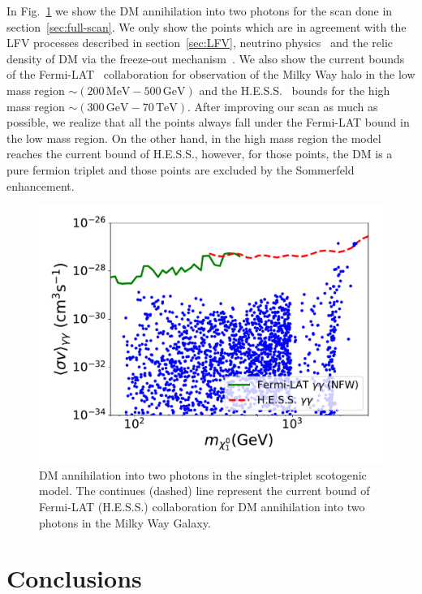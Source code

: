 \documentclass[12pt,letterpaper]{article}
\begin{document}
In Fig.~\ref{fig:sigmavgg} we show the DM annihilation into two photons for the scan done in section~\ref{sec:full-scan}. We only show the points which are in agreement with the LFV processes described in section~\ref{sec:LFV}, neutrino physics~\cite{deSalas:2017kay} and the relic density of DM via the freeze-out mechanism~\cite{Aghanim:2018eyx}.
We also show the current bounds of the Fermi-LAT~\cite{Ackermann:2015lka} collaboration for observation of the Milky Way halo in the low mass region $\sim (200\,\text{MeV}-500\,\text{GeV})$ and the H.E.S.S.~\cite{Abdallah:2018qtu} bounds for the high mass region $\sim (300\,\text{GeV}-70\,\text{TeV})$.
After improving our scan as much as possible, we realize that all the points always fall under the Fermi-LAT bound in the low mass region. On the other hand, in the high mass region the model reaches the current bound of H.E.S.S., however, for those points, the DM is a pure fermion triplet and those points are excluded by the Sommerfeld enhancement.
\begin{figure}
\begin{center}
\includegraphics[scale=0.5]{sigmavgg_with_neutrino_physics}
\caption{DM annihilation into two photons in the singlet-triplet scotogenic model. The continues (dashed) line represent the current bound of Fermi-LAT (H.E.S.S.) collaboration for DM annihilation into two photons in the Milky Way Galaxy.}
\label{fig:sigmavgg}
\end{center}
\end{figure}
 


\section{Conclusions}
\label{sec:conclusions}
\end{document}
